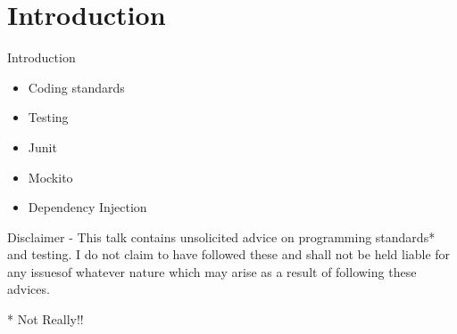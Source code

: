 \section{Introduction}

\begin{frame}[fragile]{Introduction}
\begin{itemize}
    \item Coding standards
    \item Testing
    \item Junit
    \item Mockito
    \item Dependency Injection
\end {itemize}

\begin{framed}
Disclaimer - This talk contains unsolicited advice on programming standards* and testing.
I do not claim to have followed these and shall not be held liable for any issuesof 
whatever nature which may arise as a result of following these advices.

* Not Really!!
\end{framed}
\end{frame}